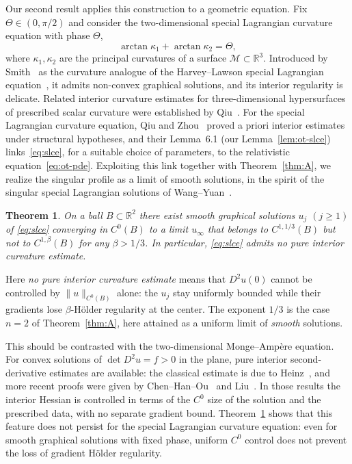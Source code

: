 \documentclass[12pt,letterpaper]{amsart}
\theoremstyle{definition}
\theoremstyle{plain}
\newtheorem{theorem}[definition]{Theorem}
\numberwithin{equation}{section}
\newcommand{\R}{\mathbb{R}}
\begin{document}
Our second result applies this construction to a geometric equation. Fix $\Theta\in(0,\pi/2)$
and consider the two-dimensional special Lagrangian curvature equation with phase $\Theta$,
\begin{equation}\label{eq:slce}
    \arctan\kappa_1+\arctan\kappa_2=\Theta,
\end{equation}
where $\kappa_1,\kappa_2$ are the principal curvatures of a surface $\mathcal{M}\subset\R^3$.
Introduced by Smith~\cite{S13} as the curvature analogue of the Harvey--Lawson special
Lagrangian equation~\cite{HL82}, it admits non-convex graphical solutions, and its interior regularity is
delicate. Related interior curvature estimates for three-dimensional hypersurfaces of prescribed
scalar curvature were established by Qiu~\cite{Qiu24}. For the special Lagrangian curvature
equation, Qiu and Zhou~\cite{QZ26} proved a priori interior estimates under structural
hypotheses, and their Lemma~6.1 (our Lemma~\ref{lem:ot-slce}) links~\eqref{eq:slce}, for a
suitable choice of parameters, to the relativistic equation~\eqref{eq:ot-pde}. Exploiting this
link together with Theorem~\ref{thm:A}, we realize the singular profile as a limit of smooth
solutions, in the spirit of the singular special Lagrangian solutions of Wang--Yuan~\cite{WY13}.

\begin{theorem}\label{thm:B}
    On a ball $B\subset\R^2$ there exist smooth graphical solutions $u_j$ $(j\geq1)$ of
    \eqref{eq:slce} converging in $C^0(B)$ to a limit $u_\infty$ that belongs to $C^{1,1/3}(B)$
    but not to $C^{1,\beta}(B)$ for any $\beta>1/3$. In particular, \eqref{eq:slce} admits no
    pure interior curvature estimate.
\end{theorem}

Here {\it no pure interior curvature estimate} means that $D^2u(0)$ cannot be
controlled by $\|u\|_{C^0(B)}$ alone: the $u_j$ stay uniformly bounded
while their gradients lose $\beta$-H\"older regularity at the center. The exponent $1/3$ is the case
$n=2$ of Theorem~\ref{thm:A}, here attained as a uniform limit of {\it smooth} solutions.

This should be contrasted with the two-dimensional Monge--Amp\`ere equation. For convex
solutions of $\det D^2u=f>0$ in the plane, pure interior second-derivative estimates are
available: the classical estimate is due to Heinz~\cite{He59}, and more recent proofs were
given by Chen--Han--Ou~\cite{CHO16} and Liu~\cite{Liu20}. In those results the
interior Hessian is controlled in terms of the $C^0$ size of the solution and the prescribed
data, with no separate gradient bound. Theorem~\ref{thm:B} shows that this feature does not
persist for the special Lagrangian curvature equation: even for smooth graphical solutions
with fixed phase, uniform $C^0$ control does not prevent the loss of gradient H\"older
regularity.
\end{document}
